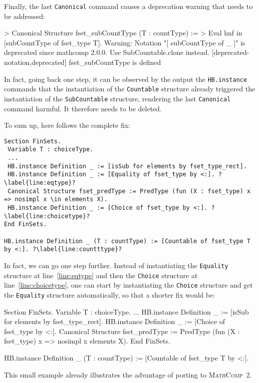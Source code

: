 \documentclass{article}
\def\mathcomp{\textsc{MathComp}}
\def\mathcomptwo{\mathcomp~2}
\def\coqin#1{\texttt{#1}}
\begin{document}
Finally, the last \coqin{Canonical} command causes a deprecation
warning that needs to be addressed:
\begin{failure}
> Canonical Structure fset_subCountType (T : countType) :=
>  Eval hnf in [subCountType of fset_type T].
Warning: Notation "[ subCountType of _ ]" is deprecated since mathcomp 2.0.0.
Use SubCountable.clone instead.
[deprecated-notation,deprecated]
fset_subCountType is defined  
\end{failure}
In fact, going back one step, it can be observed by the output the
\coqin{HB.instance} commands that the instantiation of the
\coqin{Countable} structure already triggered the instantiation of the
\coqin{SubCountable} structure, rendering the last \coqin{Canonical}
command harmful. It therefore needs to be deleted.

To sum up, here follows the complete fix:
\begin{verbatim}
Section FinSets.
 Variable T : choiceType.
 ...
 HB.instance Definition _ := [isSub for elements by fset_type_rect].
 HB.instance Definition _ := [Equality of fset_type by <:]. ?\label{line:eqtype}?
 Canonical Structure fset_predType := PredType (fun (X : fset_type) x => nosimpl x \in elements X).
 HB.instance Definition _ := [Choice of fset_type by <:]. ?\label{line:choicetype}?
End FinSets.

HB.instance Definition _ (T : countType) := [Countable of fset_type T by <:]. ?\label{line:countttype}?
\end{verbatim}

In fact, we can go one step further. Instead of instantiating the
\coqin{Equality} structure at line~\ref{line:eqtype} and then the
\coqin{Choice} structure at line~\ref{line:choicetype}, one can start
by instantiating the \coqin{Choice} structure and get the
\coqin{Equality} structure automatically, so that a shorter fix would
be:
\begin{success}
Section FinSets.
 Variable T : choiceType.
 ...
 HB.instance Definition _ := [isSub for elements by fset_type_rect].
 HB.instance Definition _ := [Choice of fset_type by <:].
 Canonical Structure fset_predType := PredType (fun (X : fset_type) x => nosimpl x \in elements X).
End FinSets.

HB.instance Definition _ (T : countType) := [Countable of fset_type T by <:].
\end{success}
This small example already illustrates the advantage of porting to \mathcomptwo.
\end{document}

